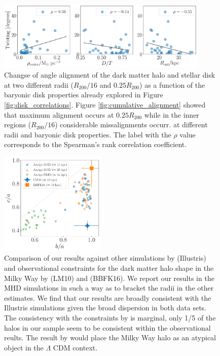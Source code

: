 \documentclass[a4paper,fleqn,usenatbib]{mnras}
\begin{document}
\begin{figure}
\begin{center}
\includegraphics[width=0.9\textwidth]{correlations_angles_alignment_MHD.pdf}
\end{center}
\caption{Changse of angle alignment of the dark
  matter halo and stellar disk at two different radii ($R_{200}/16$
  and $0.25R_{200}$) as a function of the baryonic disk properties
  already explored in Figure \ref{fig:disk_correlations}.  
  Figure \ref{fig:cumulative_alignment} showed that maximum alignment
  occurs at $0.25R_{200}$ while in the inner regions ($R_{200}/16$)
  considerable missalignments occurr.
 at different radii
 and baryonic disk properties. 
 The label with the $\rho$ value corresponds to the Spearman’s rank correlation coefficient. }
\label{fig:alignment_correlations}
\end{figure}



\begin{figure}
\begin{center}
\includegraphics[width=0.45\textwidth]{triaxiality_observations.pdf}
\end{center}
\caption{Comparison of our results against other simulations
  by \citet{Chua19} (Illustris) and observational constraints for the 
dark matter halo shape in the Milky Way by \citet{LM10} (LM10) and
\citet{Bovy16} (BBFK16).   
We report our results in the MHD simulations in such a way as to
bracket the radii in the other estimates.
We find that our results are broadly consistent with the Illustris
simulations given the broad dispersion in both data sets.
The consistency with the constraints by \citet{Bovy16} is marginal,
only 1/5 of the halos in our sample seem to be consistent within the
observational reults.
The result by \citet{LM10} would place the Milky Way halo as an
atypical object in the $\Lambda$ CDM context.} 
\label{fig:observations}
\end{figure}
\end{document}
